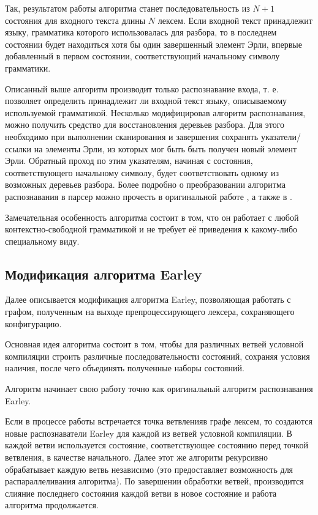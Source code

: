 Так, результатом работы алгоритма станет последовательность из $N+1$ состояния для входного текста длины $N$ лексем. Если входной текст принадлежит языку, грамматика которого использовалась для разбора, то в последнем состоянии будет находиться хотя бы один завершенный элемент Эрли, впервые добавленный в первом состоянии, соответствующий начальному символу грамматики.

Описанный выше алгоритм производит только распознавание входа, т. е. позволяет определить принадлежит ли входной текст языку, описываемому используемой грамматикой. Несколько модифицировав алгоритм распознавания, можно получить средство для восстановления деревьев разбора. Для этого необходимо при выполнении сканирования и завершения сохранять указатели/ссылки на элементы Эрли, из которых мог быть быть получен новый элемент Эрли. Обратный проход по этим указателям, начиная с состояния, соответствующего начальному символу, будет соответствовать одному из возможных деревьев разбора. Более подробно о преобразовании алгоритма распознавания в парсер можно прочесть в оригинальной работе \cite{earley68}, а также в \cite{recognizertoparser}.

Замечательная особенность алгоритма состоит в том, что он работает с любой контекстно-свободной грамматикой и не требует её приведения к какому-либо специальному виду.

\subsection{Модификация алгоритма Earley}

Далее описывается модификация алгоритма Earley, позволяющая работать с графом, полученным на выходе препроцессирующего лексера, сохраняющего конфигурацию. 

Основная идея алгоритма состоит в том, чтобы для различных ветвей условной компиляции строить различные последовательности состояний, сохраняя условия наличия, после чего объединять полученные наборы состояний.

Алгоритм начинает свою работу точно как оригинальный алгоритм распознавания Earley.

Если в процессе работы встречается точка ветвленияв графе лексем, то создаются новые распознаватели Earley для каждой из ветвей условной компиляции. В каждой ветви используется состояние, соответствующее состоянию перед точкой ветвления, в качестве начального. Далее этот же алгоритм рекурсивно обрабатывает каждую ветвь независимо (это предоставляет возможность для распараллеливания алгоритма). По завершении обработки ветвей, производится слияние последнего состояния каждой ветви в новое состояние и работа алгоритма продолжается.


